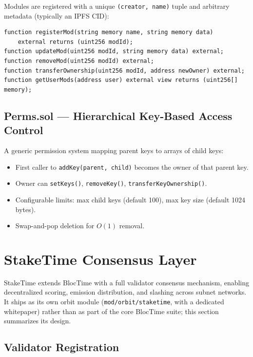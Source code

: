 \documentclass[11pt,a4paper]{article}
\begin{document}
Modules are registered with a unique \texttt{(creator, name)} tuple and arbitrary metadata (typically an IPFS CID):

\begin{lstlisting}[style=solidity]
function registerMod(string memory name, string memory data)
    external returns (uint256 modId);
function updateMod(uint256 modId, string memory data) external;
function removeMod(uint256 modId) external;
function transferOwnership(uint256 modId, address newOwner) external;
function getUserMods(address user) external view returns (uint256[] memory);
\end{lstlisting}

\subsection{Perms.sol --- Hierarchical Key-Based Access Control}

A generic permission system mapping parent keys to arrays of child keys:

\begin{itemize}
    \item First caller to \texttt{addKey(parent, child)} becomes the owner of that parent key.
    \item Owner can \texttt{setKeys()}, \texttt{removeKey()}, \texttt{transferKeyOwnership()}.
    \item Configurable limits: max child keys (default 100), max key size (default 1024 bytes).
    \item Swap-and-pop deletion for $O(1)$ removal.
\end{itemize}

\section{StakeTime Consensus Layer}
\label{sec:staketime}

StakeTime extends BlocTime with a full validator consensus mechanism, enabling decentralized scoring, emission distribution, and slashing across subnet networks. It ships as its own orbit module (\texttt{mod/orbit/staketime}, with a dedicated whitepaper) rather than as part of the core BlocTime suite; this section summarizes its design.

\subsection{Validator Registration}
\end{document}

